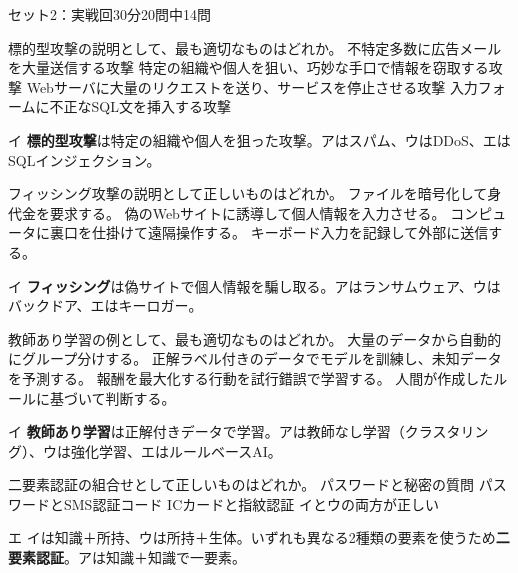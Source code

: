 \begin{mogishi}{セット2：実戦回}{30分}{20問中14問}
\begin{itpmon}[\diffbadge{標}]{標的型攻撃の説明として、最も適切なものはどれか。}
\sentakushi
  {不特定多数に広告メールを大量送信する攻撃}
  {特定の組織や個人を狙い、巧妙な手口で情報を窃取する攻撃}
  {Webサーバに大量のリクエストを送り、サービスを停止させる攻撃}
  {入力フォームに不正なSQL文を挿入する攻撃}
\end{itpmon}
\begin{kaisetsu}{イ}
\textbf{標的型攻撃}は特定の組織や個人を狙った攻撃。アはスパム、ウはDDoS、エはSQLインジェクション。
\end{kaisetsu}

\begin{itpmon}[\diffbadge{標}]{フィッシング攻撃の説明として正しいものはどれか。}
\sentakushi
  {ファイルを暗号化して身代金を要求する。}
  {偽のWebサイトに誘導して個人情報を入力させる。}
  {コンピュータに裏口を仕掛けて遠隔操作する。}
  {キーボード入力を記録して外部に送信する。}
\end{itpmon}
\begin{kaisetsu}{イ}
\textbf{フィッシング}は偽サイトで個人情報を騙し取る。アはランサムウェア、ウはバックドア、エはキーロガー。
\end{kaisetsu}

\begin{itpmon}[\diffbadge{標}]{教師あり学習の例として、最も適切なものはどれか。}
\sentakushi
  {大量のデータから自動的にグループ分けする。}
  {正解ラベル付きのデータでモデルを訓練し、未知データを予測する。}
  {報酬を最大化する行動を試行錯誤で学習する。}
  {人間が作成したルールに基づいて判断する。}
\end{itpmon}
\begin{kaisetsu}{イ}
\textbf{教師あり学習}は正解付きデータで学習。アは教師なし学習（クラスタリング）、ウは強化学習、エはルールベースAI。
\end{kaisetsu}

\begin{itpmon}[\diffbadge{標}]{二要素認証の組合せとして正しいものはどれか。}
\sentakushi
  {パスワードと秘密の質問}
  {パスワードとSMS認証コード}
  {ICカードと指紋認証}
  {イとウの両方が正しい}
\end{itpmon}
\begin{kaisetsu}{エ}
イは知識＋所持、ウは所持＋生体。いずれも異なる2種類の要素を使うため\textbf{二要素認証}。アは知識＋知識で一要素。
\end{kaisetsu}

\end{mogishi}

